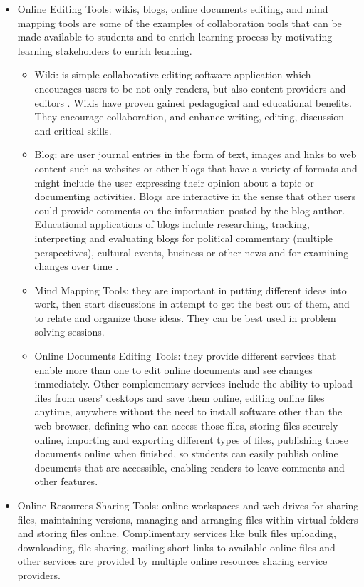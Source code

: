 \documentclass[12pt,a4paper,final,twoside,onecolumn,titlepage]{book}
\begin{document}
\begin{itemize}
\item Online Editing Tools: wikis, blogs, online documents editing, and mind mapping tools are some of the examples of collaboration tools that can be made available to students and to enrich learning process by motivating learning stakeholders to enrich learning. 
\begin{itemize}
\item Wiki: is simple collaborative editing software application which encourages users to be not only readers, but also content providers and editors \cite{W11}. Wikis have proven gained pedagogical and educational benefits. They encourage collaboration, and enhance writing, editing, discussion and critical skills.
\item Blog: are user journal entries in the form of text, images and links to web content such as websites or other blogs that have a variety of formats and might include the user expressing their opinion about a topic or documenting activities. Blogs are interactive in the sense that other users could provide comments on the information posted by the blog author. Educational applications of blogs include researching, tracking, interpreting and evaluating blogs for political commentary (multiple perspectives), cultural events, business or other news and for examining changes over time \cite{W10}.
\item Mind Mapping Tools: they are important in putting different ideas into work, then start discussions in attempt to get the best out of them, and to relate and organize those ideas. They can be best used in problem solving sessions.
\item Online Documents Editing Tools: they provide different services that enable more than one to edit online documents and see changes immediately. Other complementary services include the ability to upload files from users’ desktops and save them online, editing online files anytime, anywhere without the need to install software other than the web browser, defining who can access those files, storing files securely online, importing and exporting different types of files, publishing those documents online when finished, so students can easily publish online documents that are accessible, enabling readers to leave comments and other features. 
\end{itemize}
\item Online Resources Sharing Tools: online workspaces and web drives for sharing files, maintaining versions, managing and arranging files within virtual folders and storing files online. Complimentary services like bulk files uploading, downloading, file sharing, mailing short links to available online files and other services are provided by multiple online resources sharing service providers.

\end{itemize}
\end{document}
